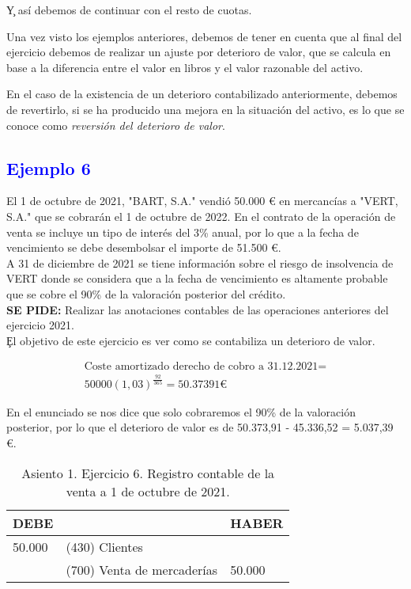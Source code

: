 \c{Y así debemos de continuar con el resto de cuotas.}

Una vez visto los ejemplos anteriores, debemos de tener en cuenta que al final del ejercicio debemos de realizar un ajuste por deterioro de valor, que se calcula en base a la diferencia entre el valor en libros y el valor razonable del activo.

En el caso de la existencia de un deterioro contabilizado anteriormente, debemos de revertirlo, si se ha producido una mejora en la situación del activo, es lo que se conoce como \textit{reversión del deterioro de valor}.

\subsection*{\textcolor{blue}{Ejemplo 6}}
El 1 de octubre de 2021, "BART, S.A." vendió 50.000 € en mercancías a "VERT, S.A." que se cobrarán el 1 de octubre de 2022. En el contrato de la operación de venta se incluye un tipo de interés del 3\% anual, por lo que a la fecha de vencimiento se debe desembolsar el importe de 51.500 €.\\

A 31 de diciembre de 2021 se tiene información sobre el riesgo de insolvencia de VERT donde se considera que a la fecha de vencimiento es altamente probable que se cobre el 90\% de la valoración posterior del crédito.\\

\textbf{SE PIDE:} Realizar las anotaciones contables de las operaciones anteriores del ejercicio 2021.\\

\c{El objetivo de este ejercicio es ver como se contabiliza un deterioro de valor.}

\begin{align*}
    \text{Coste amortizado derecho de cobro a 31.12.2021} = \\
    50000(1,03)^{\frac{92}{365}} = 50.37391 €
\end{align*}

En el enunciado se nos dice que solo cobraremos el 90\% de la valoración posterior, por lo que el deterioro de valor es de 50.373,91 - 45.336,52 = 5.037,39 €.

\begin{table}[H]
    \centering
    \begin{tabular}{|p{3cm}|p{6cm}|p{3cm}|}
    \hline
    \rowcolor{blue!30}
    \textbf{DEBE} & \textbf{} & \textbf{HABER} \\
    \hline
    50.000 & (430) Clientes &  \\
    \hline
     & (700) Venta de mercaderías & 50.000 \\
    \hline
    \end{tabular}
    \caption{Asiento 1. Ejercicio 6. Registro contable de la venta a 1 de octubre de 2021.}
    \label{tabla:asiento1ej6}
\end{table}

